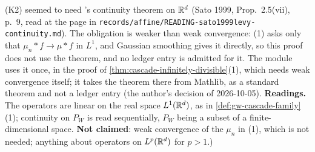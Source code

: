\begin{lemma}
{(K2) seemed to need \Levy's continuity theorem on $\mathbb{R}^d$ (Sato 1999, Prop.~2.5(vii), p.~9, read at
the page in \texttt{records/affine/READING-sato1999levy-continuity.md}). The obligation is weaker than
weak convergence: (1) asks only that $\mu_n * f \to \mu * f$ in $L^1$, and Gaussian smoothing gives
it directly, so this proof does not use the theorem, and no ledger entry is admitted for it. The
module uses it once, in the proof of \ref{thm:cascade-infinitely-divisible}(1), which needs weak
convergence itself; it takes the theorem there from Mathlib, as a standard theorem and not a ledger
entry (the author's decision of 2026-10-05). \textbf{Readings.} The
operators are linear on the real space $L^1(\mathbb{R}^d)$, as in \ref{def:gw-cascade-family}(1); continuity
on $P_W$ is read sequentially, $P_W$ being a subset of a finite-dimensional space. \textbf{Not
claimed}: weak convergence of the $\mu_n$ in (1), which is not needed; anything about operators on
$L^p(\mathbb{R}^d)$ for $p > 1$.)}
\end{lemma}

